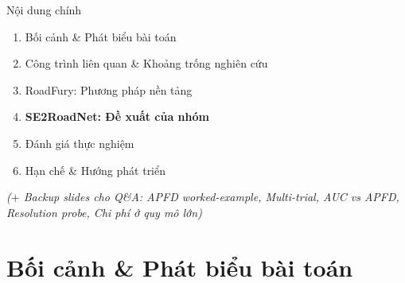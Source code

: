 \documentclass[aspectratio=169,10pt]{beamer}
\begin{document}
\begin{frame}{Nội dung chính}
\begin{enumerate}
  \item Bối cảnh \& Phát biểu bài toán
  \item Công trình liên quan \& Khoảng trống nghiên cứu
  \item RoadFury: Phương pháp nền tảng
  \item \textbf{\color{mLightBrown}SE2RoadNet: Đề xuất của nhóm}
  \item Đánh giá thực nghiệm
  \item Hạn chế \& Hướng phát triển
\end{enumerate}

\vspace{0.8em}
\centering\scriptsize\color{gray}
\textit{($+$ Backup slides cho Q\&A: APFD worked-example, Multi-trial, AUC vs APFD, Resolution probe, Chi phí ở quy mô lớn)}
\end{frame}

\section{Bối cảnh \& Phát biểu bài toán}
\end{document}
